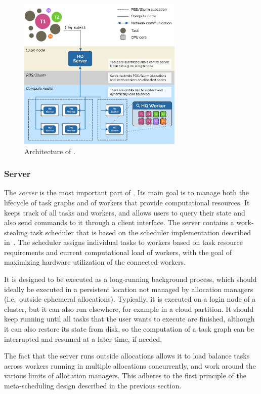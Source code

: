 \begin{figure}[h]
	\centering
	\includegraphics[width=0.7\textwidth]{imgs/hq/architecture}
	\caption{Architecture of \hyperqueue{}.}
	\label{fig:hq-architecture}
\end{figure}

\subsubsection*{Server}
The \emph{server} is the most important part of \hyperqueue{}. Its main goal is
to manage both the lifecycle of task graphs and of workers that provide computational resources. It
keeps track of all tasks and workers, and allows users to query their state and also send commands
to it through a client interface. The server contains a work-stealing task scheduler that is based
on the \rsds{} scheduler implementation described in~. The
scheduler assigns individual tasks to workers based on task resource requirements and current
computational load of workers, with the goal of maximizing hardware utilization of the connected
workers.

It is designed to be executed as a long-running background process, which should ideally be
executed in a persistent location not managed by allocation managers (i.e.\ outside ephemeral
allocations). Typically, it is executed on a login node of a cluster, but it can also run
elsewhere, for example in a cloud partition. It should keep running until all tasks that the user
wants to execute are finished, although it can also restore its state from disk, so the computation
of a task graph can be interrupted and resumed at a later time, if needed.

The fact that the server runs outside allocations allows it to load balance tasks across workers
running in multiple allocations concurrently, and work around the various limits of allocation
managers. This adheres to the first principle of the meta-scheduling design described in the
previous section.

